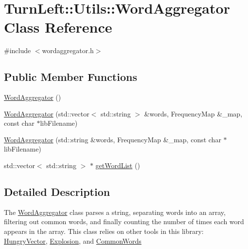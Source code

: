\hypertarget{classTurnLeft_1_1Utils_1_1WordAggregator}{
\section{TurnLeft::Utils::WordAggregator Class Reference}
\label{classTurnLeft_1_1Utils_1_1WordAggregator}
}


{\ttfamily \#include $<$wordaggregator.h$>$}

\subsection*{Public Member Functions}
\begin{DoxyCompactItemize}
\item 
\hyperlink{classTurnLeft_1_1Utils_1_1WordAggregator_a721da98f0dec33c9abadd19c04669165}{WordAggregator} ()
\item 
\hyperlink{classTurnLeft_1_1Utils_1_1WordAggregator_a10b5f069149857994a6db20e21e9ca11}{WordAggregator} (std::vector$<$ std::string $>$ \&words, FrequencyMap \&\_\-map, const char $\ast$libFilename)
\item 
\hyperlink{classTurnLeft_1_1Utils_1_1WordAggregator_a9e1a0859a5a78786c59ccaebd30440e7}{WordAggregator} (std::string \&words, FrequencyMap \&\_\-map, const char $\ast$libFilename)
\item 
std::vector$<$ std::string $>$ $\ast$ \hyperlink{classTurnLeft_1_1Utils_1_1WordAggregator_a270d7b8a0a2b45b0ec5d2f8ef1911e0f}{getWordList} ()
\end{DoxyCompactItemize}


\subsection{Detailed Description}
The \hyperlink{classTurnLeft_1_1Utils_1_1WordAggregator}{WordAggregator} class parses a string, separating words into an array, filtering out common words, and finally counting the number of times each word appears in the array. This class relies on other tools in this library: \hyperlink{classTurnLeft_1_1Utils_1_1HungryVector}{HungryVector}, \hyperlink{classTurnLeft_1_1Utils_1_1Explosion}{Explosion}, and \hyperlink{classTurnLeft_1_1Utils_1_1CommonWords}{CommonWords} 

